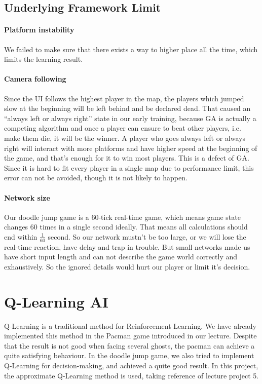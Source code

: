 \documentclass[final]{cvpr}
\begin{document}
\subsection{Underlying Framework Limit}
\paragraph{Platform instability}
We failed to make sure that there exists a way to higher place all the time, which limits the learning result. 
\paragraph{Camera following}
Since the UI follows the highest player in the map, the players which jumped slow at the beginning will be left behind and be declared dead. That caused an “always left or always right” state in our early training, because GA is actually a competing algorithm and once a player can ensure to beat other players, i.e. make them die, it will be the winner. A player who goes always left or always right will interact with more platforms and have higher speed at the beginning of the game, and that’s enough for it to win most players. This is a defect of GA. Since it is hard to fit every player in a single map due to performance limit, this error can not be avoided, though it is not likely to happen.
\paragraph{Network size}
Our doodle jump game is a 60-tick real-time game, which means game state changes 60 times in a single second ideally. That means all calculations should end within $\frac{1}{60}$ second. So our network mustn't be too large, or we will lose the real-time reaction, have delay and trap in trouble. But small networks made us have short input length and can not describe the game world correctly and exhaustively. So the ignored details would hurt our player or limit it's decision.
\section{Q-Learning AI}
Q-Learning is a traditional method for Reinforcement Learning. 
We have already implemented this method in the Pacman game introduced in our lecture.
Despite that the result is not good when facing several ghosts, the pacman can achieve a quite satisfying behaviour.
In the doodle jump game, we also tried to implement Q-Learning for decision-making, and achieved a quite good result.
In this project, the approximate Q-Learning method is used, taking reference of lecture project 5.
\end{document}
